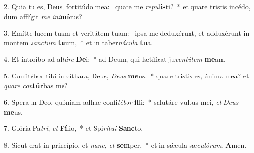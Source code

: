 2. Quia tu es, Deus, fortitúdo mea: \dag\  quare me \textit{re}\textit{pu}\textbf{lís}ti?~*  et quare tristis incédo, dum afflígit \textit{me} \textit{in}\textit{i}\textbf{mí}cus?\

3. Emítte lucem tuam et veritátem tuam: \dag\  ipsa me deduxérunt, et adduxérunt in montem \textit{sanc}\textit{tum} \textbf{tu}um,~*  et in taber\textit{ná}\textit{cu}\textit{la} \textbf{tu}a.\

4. Et introíbo ad al\textit{tá}\textit{re} \textbf{De}i:~*  ad Deum, qui lætíficat ju\textit{ven}\textit{tú}\textit{tem} \textbf{me}am.\

5. Confitébor tibi in cíthara, Deus, \textit{De}\textit{us} \textbf{me}us:~*  quare tristis es, ánima mea? et \textit{qua}\textit{re} \textit{con}\textbf{túr}bas me?\

6. Spera in Deo, quóniam adhuc confi\textit{té}\textit{bor} \textbf{il}li:~*  salutáre vultus mei, \textit{et} \textit{De}\textit{us} \textbf{me}us.\

7. Glória Pa\textit{tri}, \textit{et} \textbf{Fí}lio,~*  et Spi\textit{rí}\textit{tu}\textit{i} \textbf{Sanc}to.\

8. Sicut erat in princípio, et \textit{nunc}, \textit{et} \textbf{sem}per,~*  et in sǽcula sæ\textit{cu}\textit{ló}\textit{rum}. \textbf{A}men.\

